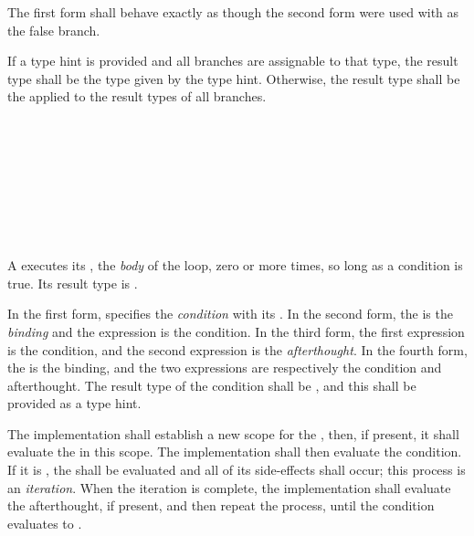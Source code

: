 \specsubsubitem
The first form shall behave exactly as though the second form were used with
 as the false branch.

\specsubsubitem
If a type hint is provided and all branches are assignable to that type, the
result type shall be the type given by the type hint. Otherwise, the result type
shall be the  applied to the result
types of all branches.


\begin{grammar}
 \\
	 \terminal{(}  \terminal{)}  \\

 \\
	 \\
	 \terminal{;}  \\
	 \terminal{;}  \\
	 \terminal{;}  \terminal{;}  \\
\end{grammar}

\specsubsubitem
A  executes its , the
\textit{body} of the loop, zero or more times, so long as a condition is true.
Its result type is .

\specsubsubitem
In the first form,  specifies the \textit{condition}
with its . In the second form, the
 is the \textit{binding} and the expression is the
condition. In the third form, the first expression is the condition, and the
second expression is the \textit{afterthought}. In the fourth form, the
 is the binding, and the two expressions are
respectively the condition and afterthought. The result type of the condition
shall be , and this shall be provided as a type hint.

\specsubsubitem
The implementation shall establish a new scope for the
, then, if present, it shall evaluate the
 in this scope. The implementation shall then evaluate the
condition. If it is , the  shall be
evaluated and all of its side-effects shall occur; this process is an
\textit{iteration}. When the iteration is complete, the implementation shall
evaluate the afterthought, if present, and then repeat the process, until the
condition evaluates to .

